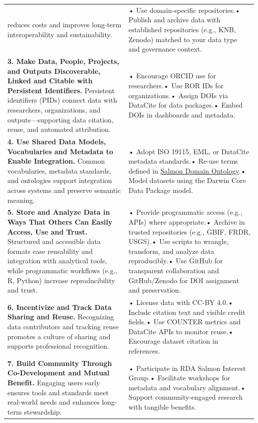\documentclass[
  letterpaper,
  DIV=11,
  numbers=noendperiod]{scrartcl}
\begin{document}
\begin{longtable}[]{@{}
  >{\raggedright\arraybackslash}p{}
  >{\raggedright\arraybackslash}p{}@{}}
reduces costs and improves long-term interoperability and
sustainability. & • Use domain-specific repositories.• Publish and
archive data with established repositories (e.g., KNB, Zenodo) matched
to your data type and governance context. \\
\textbf{3. Make Data, People, Projects, and Outputs Discoverable, Linked
and Citable with Persistent Identifiers.} Persistent identifiers (PIDs)
connect data with researchers, organizations, and outputs---supporting
data citation, reuse, and automated attribution. & • Encourage ORCID use
for researchers.• Use ROR IDs for organizations.• Assign DOIs via
DataCite for data packages.• Embed DOIs in dashboards and metadata. \\
\textbf{4. Use Shared Data Models, Vocabularies and Metadata to Enable
Integration.} Common vocabularies, metadata standards, and ontologies
support integration across systems and preserve semantic meaning. & •
Adopt ISO 19115, EML, or DataCite metadata standards.• Re-use terms
defined in
\href{https://github.com/salmon-data-mobilization/salmon-domain-ontology/}{Salmon
Domain Ontology}.• Model datasets using the Darwin Core Data Package
model. \\
\textbf{5. Store and Analyze Data in Ways That Others Can Easily Access,
Use and Trust.} Structured and accessible data formats ease reusability
and integration with analytical tools, while programmatic workflows
(e.g., R, Python) increase reproducibility and trust. & • Provide
programmatic access (e.g., APIs) where appropriate.• Archive in trusted
repositories (e.g., GBIF, FRDR, USGS).• Use scripts to wrangle,
transform, and analyze data reproducibly.• Use GitHub for transparent
collaboration and GitHub/Zenodo for DOI assignment and preservation. \\
\textbf{6. Incentivize and Track Data Sharing and Reuse.} Recognizing
data contributors and tracking reuse promotes a culture of sharing and
supports professional recognition. & • License data with CC-BY 4.0.•
Include citation text and visible credit fields.• Use COUNTER metrics
and DataCite APIs to monitor reuse.• Encourage dataset citation in
references. \\
\textbf{7. Build Community Through Co-Development and Mutual Benefit.}
Engaging users early ensures tools and standards meet real-world needs
and enhances long-term stewardship. & • Participate in RDA Salmon
Interest Group.• Facilitate workshops for metadata and vocabulary
alignment.• Support community-engaged research with tangible
benefits. \\
\end{longtable}
\end{document}
